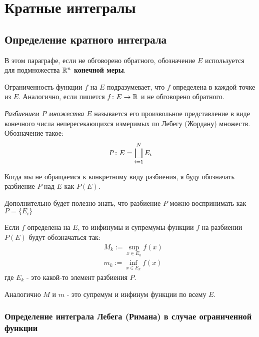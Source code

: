 \section{Кратные интегралы}

\subsection{Определение кратного интеграла}

\begin{designation}
	В этом параграфе, если не обговорено обратного, обозначение $E$ используется для подмножества $\mathbb{R}^n$ \textbf{конечной меры}.
\end{designation}

\begin{reminder}
	Ограниченность функции $f$ на $E$ подразумевает, что $f$ определена в каждой точке из $E$. Аналогично, если пишется $f \colon E \to \mathbb{R}$ и не обговорено обратного.
\end{reminder}

\begin{definition}
	\textit{Разбиением $P$ множества $E$} называется его произвольное представление в виде конечного числа непересекающихся измеримых по Лебегу (Жордану) множеств. Обозначение такое:
	\[
		P \colon E = \bigsqcup_{i = 1}^N E_i
	\]
\end{definition}

\begin{anote}
	Когда мы не обращаемся к конкретному виду разбиения, я буду обозначать разбиение $P$ над $E$ как $P(E)$.
	
	Дополнительно будет полезно знать, что разбиение $P$ можно воспринимать как $P = \{E_i\}$
\end{anote}

\begin{designation}
	Если $f$ определена на $E$, то инфинумы и супремумы функции $f$ на разбиении $P(E)$ будут обозначаться так:
	\begin{align*}
		&{M_k := \sup_{x \in E_k} f(x)}
		\\
		&{m_k := \inf_{x \in E_k} f(x)}
	\end{align*}
	где $E_k$ - это какой-то элемент разбиения $P$.
	
	Аналогично $M$ и $m$ - это супремум и инфинум функции по всему $E$.
\end{designation}

\subsubsection*{Определение интеграла Лебега (Римана) в случае ограниченной функции}

